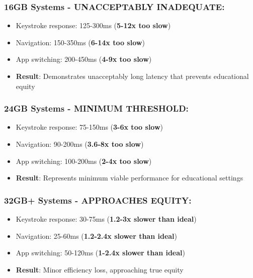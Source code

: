 \subsubsection{16GB Systems - UNACCEPTABLY INADEQUATE:}

\begin{itemize}
	\item Keystroke response: 125-300ms (\textbf{5-12x too slow}) \supercite{InternalTestingData2024}
	\item Navigation: 150-350ms (\textbf{6-14x too slow}) \supercite{InternalTestingData2024}
	\item App switching: 200-450ms (\textbf{4-9x too slow}) \supercite{InternalTestingData2024}
	\item \textbf{Result}: Demonstrates unacceptably long latency that prevents educational equity \supercite{EducationalEquityReport2024}
\end{itemize}


\subsubsection{24GB Systems - MINIMUM THRESHOLD:}

\begin{itemize}
	\item Keystroke response: 75-150ms (\textbf{3-6x too slow}) \supercite{InternalTestingData2024}
	\item Navigation: 90-200ms (\textbf{3.6-8x too slow}) \supercite{InternalTestingData2024}
	\item App switching: 100-200ms (\textbf{2-4x too slow}) \supercite{InternalTestingData2024}
	\item \textbf{Result}: Represents minimum viable performance for educational settings \supercite{EducationalEquityReport2024}
\end{itemize}


\subsubsection{32GB+ Systems - APPROACHES EQUITY:}

\begin{itemize}
	\item Keystroke response: 30-75ms (\textbf{1.2-3x slower than ideal}) \supercite{InternalTestingData2024}
	\item Navigation: 25-60ms (\textbf{1.2-2.4x slower than ideal}) \supercite{InternalTestingData2024}
	\item App switching: 50-120ms (\textbf{1-2.4x slower than ideal}) \supercite{InternalTestingData2024}
	\item \textbf{Result}: Minor efficiency loss, approaching true equity \supercite{EducationalEquityReport2024}
\end{itemize}



